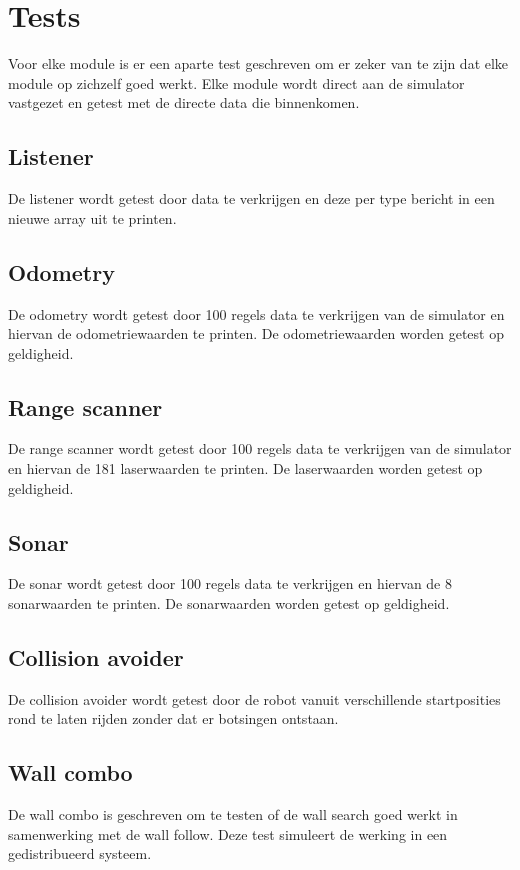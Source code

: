 \documentclass[a4paper,10pt]{article}
\begin{document}
\section{Tests}
Voor elke module is er een aparte test geschreven om er zeker van te zijn dat elke module op zichzelf goed werkt. Elke module wordt direct aan de simulator vastgezet en getest met de directe data die binnenkomen. 

\subsection{Listener}
De listener wordt getest door data te verkrijgen en deze per type bericht in een nieuwe array uit te printen.

\subsection{Odometry}
De odometry wordt getest door 100 regels data te verkrijgen van de simulator en hiervan de odometriewaarden te printen. De odometriewaarden worden getest op geldigheid.

\subsection{Range scanner}
De range scanner wordt getest door 100 regels data te verkrijgen van de simulator en hiervan de 181 laserwaarden te printen. De laserwaarden worden getest op geldigheid.

\subsection{Sonar}
De sonar wordt getest door 100 regels data te verkrijgen en  hiervan de 8 sonarwaarden te printen. De sonarwaarden worden getest op geldigheid.

\subsection{Collision avoider}
De collision avoider wordt getest door de robot vanuit verschillende startposities rond te laten rijden zonder dat er botsingen ontstaan.

\subsection{Wall combo}
De wall combo is geschreven om te testen of de wall search goed werkt in samenwerking met de wall follow. Deze test simuleert
de werking in een gedistribueerd systeem.
\end{document}
